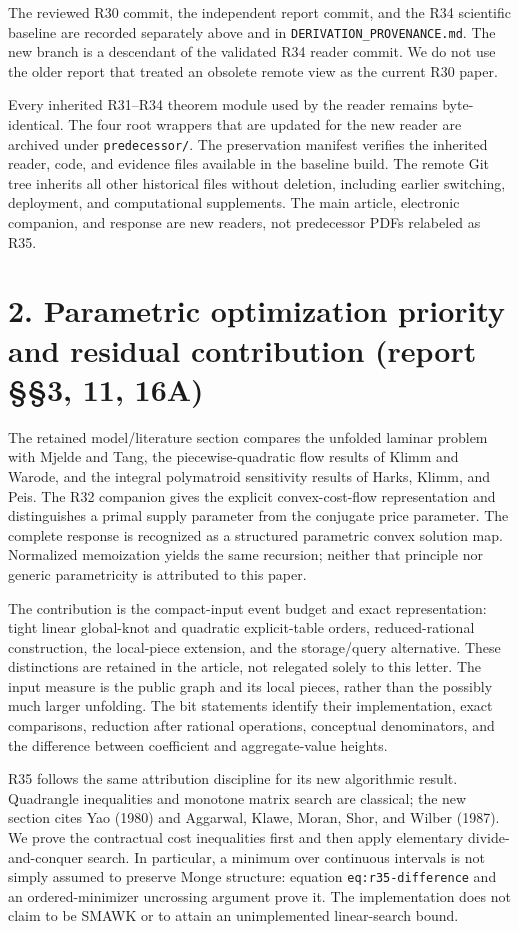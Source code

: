 \documentclass[11pt,letterpaper]{article}
\begin{document}
The reviewed R30 commit, the independent report commit, and the R34 scientific baseline are recorded separately above and in \nolinkurl{DERIVATION_PROVENANCE.md}. The new branch is a descendant of the validated R34 reader commit. We do not use the older report that treated an obsolete remote view as the current R30 paper.


Every inherited R31--R34 theorem module used by the reader remains byte-identical. The four root wrappers that are updated for the new reader are archived under \nolinkurl{predecessor/}. The preservation manifest verifies the inherited reader, code, and evidence files available in the baseline build. The remote Git tree inherits all other historical files without deletion, including earlier switching, deployment, and computational supplements. The main article, electronic companion, and response are new readers, not predecessor PDFs relabeled as R35.


\section*{2. Parametric optimization priority and residual contribution (report §§3, 11, 16A)}

The retained model/literature section compares the unfolded laminar problem with Mjelde and Tang, the piecewise-quadratic flow results of Klimm and Warode, and the integral polymatroid sensitivity results of Harks, Klimm, and Peis. The R32 companion gives the explicit convex-cost-flow representation and distinguishes a primal supply parameter from the conjugate price parameter. The complete response is recognized as a structured parametric convex solution map. Normalized memoization yields the same recursion; neither that principle nor generic parametricity is attributed to this paper.


The contribution is the compact-input event budget and exact representation: tight linear global-knot and quadratic explicit-table orders, reduced-rational construction, the local-piece extension, and the storage/query alternative. These distinctions are retained in the article, not relegated solely to this letter. The input measure is the public graph and its local pieces, rather than the possibly much larger unfolding. The bit statements identify their implementation, exact comparisons, reduction after rational operations, conceptual denominators, and the difference between coefficient and aggregate-value heights.


R35 follows the same attribution discipline for its new algorithmic result. Quadrangle inequalities and monotone matrix search are classical; the new section cites Yao (1980) and Aggarwal, Klawe, Moran, Shor, and Wilber (1987). We prove the contractual cost inequalities first and then apply elementary divide-and-conquer search. In particular, a minimum over continuous intervals is not simply assumed to preserve Monge structure: equation \nolinkurl{eq:r35-difference} and an ordered-minimizer uncrossing argument prove it. The implementation does not claim to be SMAWK or to attain an unimplemented linear-search bound.
\end{document}
